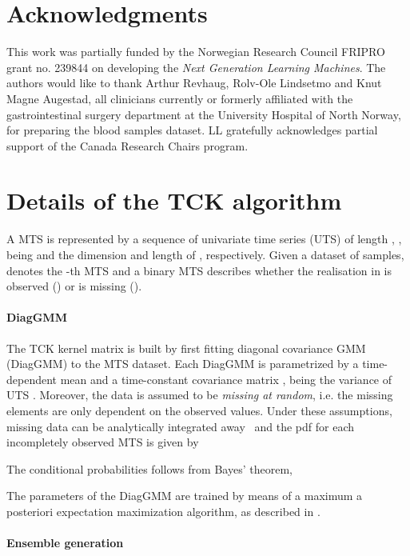 \documentclass[a4paper,10pt,pdftex]{article}
\begin{document}
\section*{Acknowledgments}
This work was partially funded by the Norwegian Research Council FRIPRO grant no. 239844 on developing the \emph{Next Generation Learning Machines}.
The authors would like to thank Arthur Revhaug, Rolv-Ole Lindsetmo and Knut Magne Augestad, all clinicians currently or formerly affiliated with the gastrointestinal surgery department at the University Hospital of North Norway, for preparing the blood samples dataset.
LL gratefully acknowledges partial support of the Canada Research Chairs program.

\appendix

\section{Details of the TCK algorithm}
\label{app:tck}

A MTS  is represented by a sequence of  univariate time series (UTS) of length ,
, being  and  the dimension and length of , respectively.
Given a dataset of  samples,  denotes the -th MTS and a binary MTS  describes whether the realisation  in  is observed () or is missing ().

\paragraph{\textbf{DiagGMM}}

The TCK kernel matrix is built by first fitting  diagonal covariance GMM (DiagGMM) to the MTS dataset.
Each DiagGMM  is parametrized by a time-dependent mean  and a time-constant covariance matrix , being  the variance of UTS .
Moreover, the data is assumed to be \textit{missing at random}, i.e. the missing elements are only dependent on the observed values.
Under these assumptions, missing data can be analytically integrated away~\cite{rubin1976inference} and the pdf for each incompletely observed MTS  is given by


The conditional probabilities follows from Bayes' theorem,

The parameters of the DiagGMM are trained by means of a maximum a posteriori expectation maximization algorithm, as described in \cite{mikalsen2017time}. 

\paragraph{\textbf{Ensemble generation}}
\end{document}
